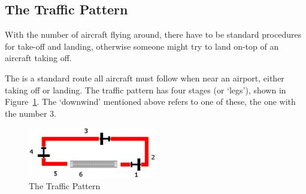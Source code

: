 \subsection{The Traffic Pattern}

With the number of aircraft flying around, there have to be standard procedures for take-off and landing, otherwise someone might try to land on-top of an aircraft taking off. 

The  is a standard route all aircraft must follow when near an airport, either taking off or landing. The traffic pattern has four stages (or `legs'), shown in Figure~\ref{pattern}. The `downwind' mentioned above refers to one of these, the one with the number 3.

\begin{figure}[!htp]
\centering
\includegraphics[width=0.5\textwidth]{pattern}
\caption{The Traffic Pattern\label{pattern}}
\end{figure}

